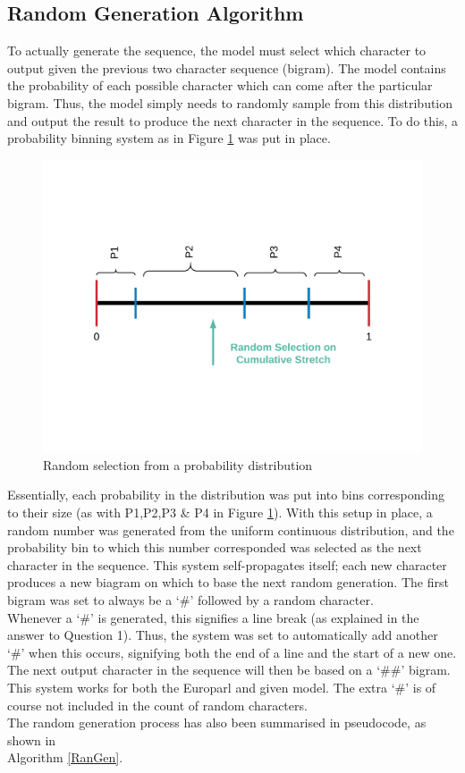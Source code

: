 \documentclass[12pt]{article}
\begin{document}
\subsection{Random Generation Algorithm}
To actually generate the sequence, the model must select which character to output given the previous two character sequence (bigram).  The model contains the probability of each possible character which can come after the particular bigram.  Thus, the model simply needs to randomly sample from this distribution and output the result to produce the next character in the sequence.  To do this, a probability binning system as in Figure \ref{fig:randomgen} was put in place.
\begin{figure}[H]
	\centering
	\includegraphics[width=0.7\linewidth]{graphics/Random_Gen}
	\caption{Random selection from a probability distribution}
	\label{fig:randomgen}
\end{figure}
Essentially, each probability in the distribution was put into bins corresponding to their size (as with P1,P2,P3 \& P4 in Figure \ref{fig:randomgen}).  With this setup in place, a random number was generated from the uniform continuous distribution, and the probability bin to which this number corresponded was selected as the next character in the sequence.  This system self-propagates itself; each new character produces a new biagram on which to base the next random generation.  The first bigram was set to always be a `\#' followed by a random character.\\
\hfill\break
Whenever a `\#' is generated, this signifies a line break (as explained in the answer to Question 1).  Thus, the system was set to automatically add another `\#' when this occurs, signifying both the end of a line and the start of a new one.  The next output character in the sequence will then be based on a `\#\#' bigram.  This system works for both the Europarl and given model.  The extra `\#' is of course not included in the count of random characters.\\
\hfill\break
The random generation process has also been summarised in pseudocode, as shown in \\Algorithm \ref{RanGen}.
\end{document}
